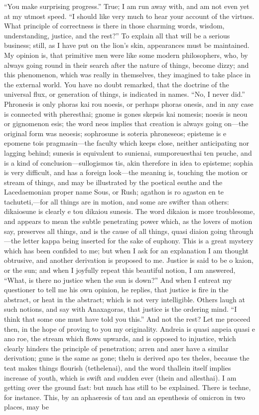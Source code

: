 \documentclass[11pt,letter]{article}
\begin{document}
\par  “You make surprising progress.” True; I am run away with, and am not even yet at my utmost speed. “I should like very much to hear your account of the virtues. What principle of correctness is there in those charming words, wisdom, understanding, justice, and the rest?” To explain all that will be a serious business; still, as I have put on the lion’s skin, appearances must be maintained. My opinion is, that primitive men were like some modern philosophers, who, by always going round in their search after the nature of things, become dizzy; and this phenomenon, which was really in themselves, they imagined to take place in the external world. You have no doubt remarked, that the doctrine of the universal flux, or generation of things, is indicated in names. “No, I never did.” Phronesis is only phoras kai rou noesis, or perhaps phoras onesis, and in any case is connected with pheresthai; gnome is gones skepsis kai nomesis; noesis is neou or gignomenon esis; the word neos implies that creation is always going on—the original form was neoesis; sophrosune is soteria phroneseos; episteme is e epomene tois pragmasin—the faculty which keeps close, neither anticipating nor lagging behind; sunesis is equivalent to sunienai, sumporeuesthai ten psuche, and is a kind of conclusion—sullogismos tis, akin therefore in idea to episteme; sophia is very difficult, and has a foreign look—the meaning is, touching the motion or stream of things, and may be illustrated by the poetical esuthe and the Lacedaemonian proper name Sous, or Rush; agathon is ro agaston en te tachuteti,—for all things are in motion, and some are swifter than others: dikaiosune is clearly e tou dikaiou sunesis. The word dikaion is more troublesome, and appears to mean the subtle penetrating power which, as the lovers of motion say, preserves all things, and is the cause of all things, quasi diaion going through—the letter kappa being inserted for the sake of euphony. This is a great mystery which has been confided to me; but when I ask for an explanation I am thought obtrusive, and another derivation is proposed to me. Justice is said to be o kaion, or the sun; and when I joyfully repeat this beautiful notion, I am answered, “What, is there no justice when the sun is down?” And when I entreat my questioner to tell me his own opinion, he replies, that justice is fire in the abstract, or heat in the abstract; which is not very intelligible. Others laugh at such notions, and say with Anaxagoras, that justice is the ordering mind. “I think that some one must have told you this.” And not the rest? Let me proceed then, in the hope of proving to you my originality. Andreia is quasi anpeia quasi e ano roe, the stream which flows upwards, and is opposed to injustice, which clearly hinders the principle of penetration; arren and aner have a similar derivation; gune is the same as gone; thelu is derived apo tes theles, because the teat makes things flourish (tethelenai), and the word thallein itself implies increase of youth, which is swift and sudden ever (thein and allesthai). I am getting over the ground fast: but much has still to be explained. There is techne, for instance. This, by an aphaeresis of tau and an epenthesis of omicron in two places, may be 
\end{document}
